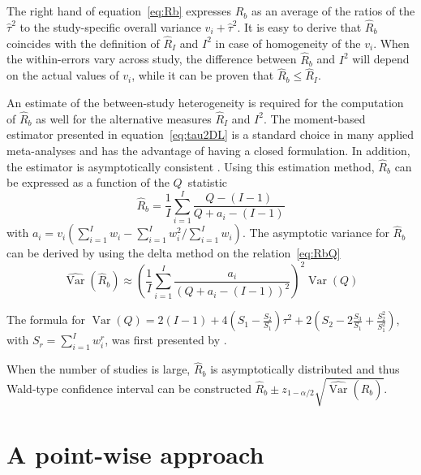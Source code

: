 \documentclass[11pt,a4paper,twoside,openany]{book}\usepackage{knitr}
\DeclareMathOperator{\Var}{Var}
\begin{document}
{\noindent The right hand of equation~\ref{eq:Rb} expresses $\hat R_b$ as an average of the ratios of the $\hat \tau^2$ to the study-specific overall variance $v_i + \hat \tau^2$. It is easy to derive that $\hat R_b$ coincides with the definition of $\hat R_I$ and $I^2$ in case of homogeneity of the $v_i$. When the within-errors vary across study, the difference between $\hat R_b$ and $I^2$ will depend on the actual values of $v_i$, while it can be proven that $\hat R_b \le \hat R_I$.

An estimate of the between-study heterogeneity is required for the computation of $\hat R_b$ as well for the alternative measures $\hat R_I$ and $I^2$. The moment-based estimator presented in equation~\ref{eq:tau2DL} is a standard choice in many applied meta-analyses and has the advantage of having a closed formulation. In addition, the estimator is asymptotically consistent \citep{jackson2010extending}. Using this estimation method, $\hat R_b$ can be expressed as a function of the $Q$~statistic
\begin{equation}
\hat R_b = \frac{1}{I} \sum_{i = 1}^I \frac{Q - (I-1)}{Q + a_i - (I - 1)} 
\label{eq:RbQ}
\end{equation}
\noindent with $a_i = v_i \left(\sum_{i = 1}^I w_i - \sum_{i = 1}^Iw_i^2/\sum_{i = 1}^I w_i \right)$. The asymptotic variance for $\hat R_b$ can be derived by using the delta method on the relation~\ref{eq:RbQ}
\begin{equation}
\widehat{\Var} \left(\hat R_b \right) \approx \left(  \frac{1}{I} \sum_{i = 1}^I \frac{a_i}{(Q + a_i - (I-1))^2} \right)^2 \Var(Q)
\label{eq:var_Rb}
\end{equation}

\noindent The formula for $\Var(Q) = 2(I-1) + 4\left(S_1 - \frac{S_2}{S_1}\right)\tau^2 + 2\left(S_2 - 2\frac{S_3}{S_1} + \frac{S_2^2}{S_1^2} \right)$, with $S_r = \sum_{i = 1}^I w_i^r$, was first presented by \cite{ biggerstaff1997incorporating}.

\noindent When the number of studies is large, $\hat R_b$ is asymptotically distributed and thus Wald-type confidence interval can be constructed $\hat R_b \pm z_{1-\alpha/2} \sqrt{ \widehat{\Var} \left(\hat R_b \right)}$.



\section{A point-wise approach}\label{sec:pwa}



}
\end{document}
